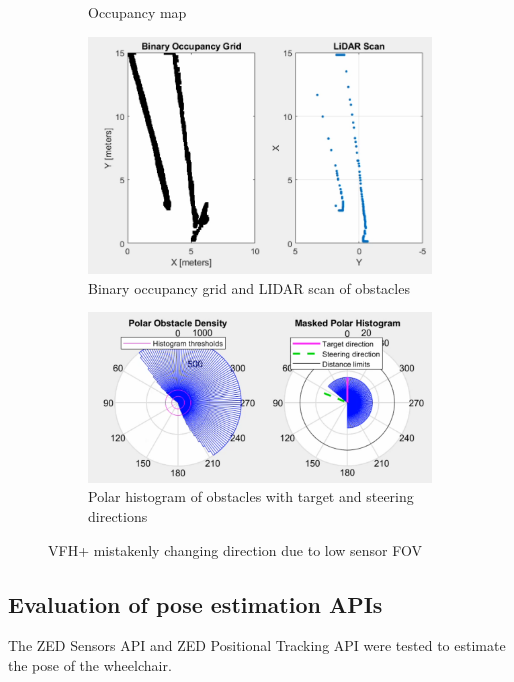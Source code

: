 \begin{figure}[b]
\begin{subfigure}{.3\textwidth}
        \caption{Occupancy map}
    \end{subfigure}
    \begin{subfigure}{.45\textwidth}
        \centering
        \includegraphics[width=\linewidth]{images/vfh_fov_lidar.PNG}
        \caption{Binary occupancy grid and LIDAR scan of obstacles}
    \end{subfigure}
    \quad
    \begin{subfigure}{.45\textwidth}
        \centering
        \includegraphics[width=\linewidth]{images/vfh_fov_hist.PNG}
        \caption{Polar histogram of obstacles with target and steering directions}
    \end{subfigure}
    \caption{VFH+ mistakenly changing direction due to low sensor FOV}
    \label{fig:vfh_mistake}
\end{figure}


\subsection{Evaluation of pose estimation APIs}
The ZED Sensors API and ZED Positional Tracking API
were tested to estimate the pose of the wheelchair.

